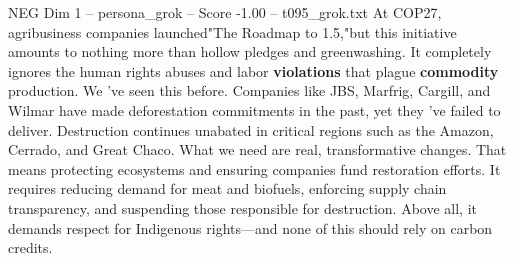 \begin{textsample}{NEG Dim 1 – persona\_grok – Score -1.00 – t095\_grok.txt}  \label{ex:f1_neg_026}
At COP27, agribusiness companies launched"The Roadmap to 1.5,"but this initiative amounts to nothing more than hollow pledges and greenwashing.
It completely ignores the human rights abuses and labor \textbf{violations} that plague \textbf{commodity} production.
We 've seen this before.
Companies like JBS, Marfrig, Cargill, and Wilmar have made deforestation commitments in the past, yet they 've failed to deliver.
Destruction continues unabated in critical regions such as the Amazon, Cerrado, and Great Chaco.
What we need are real, transformative changes.
That means protecting ecosystems and ensuring companies fund restoration efforts.
It requires reducing demand for meat and biofuels, enforcing supply chain transparency, and suspending those responsible for destruction.
Above all, it demands respect for Indigenous rights—and none of this should rely on carbon credits.

\end{textsample}
